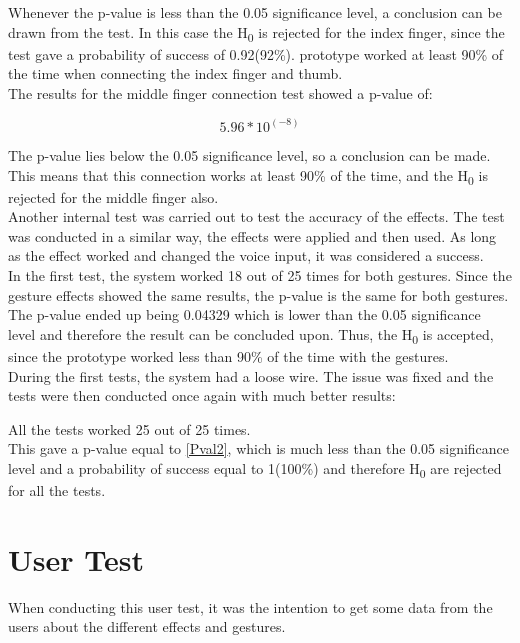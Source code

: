 Whenever the p-value is less than the 0.05 significance level, a conclusion can be drawn from the test. In this case the H\textsubscript{0} is rejected for the index finger, since the test gave a probability of success of 0.92(92\%).
prototype worked at least 90\% of the time when connecting the index finger and thumb. \\

The results for the middle finger connection test showed a p-value of:

\begin{equation}\label{Pval2}
	5.96*10^(-8)
\end{equation} 

The p-value lies below the 0.05 significance level, so a conclusion can be made. This means that this connection works at least 90\% of the time, and the H\textsubscript{0} is rejected for the middle finger also. \\

Another internal test was carried out to test the accuracy of the effects. The test was conducted in a similar way, the effects were applied and then used. 
As long as the effect worked and changed the voice input, it was considered a success. \\

In the first test, the system worked 18 out of 25 times for both gestures.
Since the gesture effects showed the same results, the p-value is the same for both gestures. 
The p-value ended up being 0.04329 which is lower than the 0.05 significance level and therefore the result can be concluded upon. Thus, the H\textsubscript{0} is accepted, since the prototype worked less than 90\% of the time with the gestures. \\

During the first tests, the system had a loose wire. The issue was fixed and the tests were then conducted once again with much better results:

All the tests worked 25 out of 25 times. \\

This gave a p-value equal to \ref{Pval2}, which is much less than the 0.05 significance level and a probability of success equal to 1(100\%) and therefore H\textsubscript{0} are rejected for all the tests.

\section{User Test}
When conducting this user test, it was the intention to get some data from the users about the different effects and gestures. 


